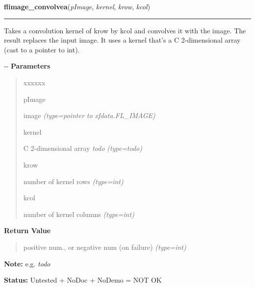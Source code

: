     \label{xformslib:flflimage:flimage_convolvea}

    \vspace{0.5ex}

\hspace{.8\funcindent}\begin{boxedminipage}{\funcwidth}

    \raggedright \textbf{flimage\_convolvea}(\textit{pImage}, \textit{kernel}, \textit{krow}, \textit{kcol})

    \vspace{-1.5ex}

    \rule{\textwidth}{0.5\fboxrule}
\setlength{\parskip}{2ex}

Takes a convolution kernel of krow by kcol and convolves it with
the image. The result replaces the input image. It uses a kernel that's a
C 2-dimensional array (cast to a pointer to int).

-{}-
\setlength{\parskip}{1ex}
      \textbf{Parameters}
      \vspace{-1ex}

      \begin{quote}
        \begin{Ventry}{xxxxxx}

          \item[pImage]


image
            {\it (type=pointer to xfdata.FL\_IMAGE)}

          \item[kernel]


C 2-dimensional array \emph{todo}
            {\it (type=\emph{todo})}

          \item[krow]


number of kernel rows
            {\it (type=int)}

          \item[kcol]


number of kernel columns
            {\it (type=int)}

        \end{Ventry}

      \end{quote}

      \textbf{Return Value}
    \vspace{-1ex}

      \begin{quote}

positive num., or negative num (on failure)
      {\it (type=int)}

      \end{quote}

\textbf{Note:} 
e.g. \emph{todo}


\textbf{Status:} 
Untested + NoDoc + NoDemo = NOT OK


    \end{boxedminipage}

